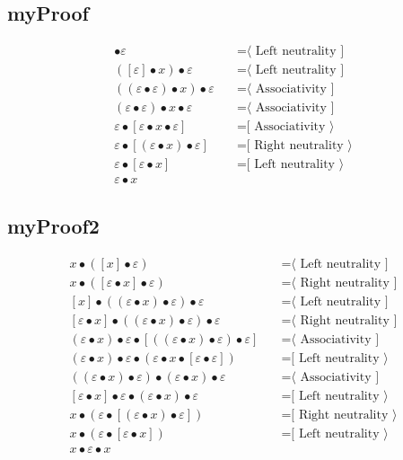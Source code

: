 \documentclass{article}
\begin{document}
\subsection{myProof}
\begin{align*}
[x] • ε
  & \quad \text{=⟨ Left neutrality ]}\\
([ε] • x) • ε
  & \quad \text{=⟨ Left neutrality ]}\\
((ε • ε) • x) • ε
  & \quad \text{=⟨ Associativity ]}\\
(ε • ε) • x • ε
  & \quad \text{=⟨ Associativity ]}\\
ε • [ε • x • ε]
  & \quad \text{=[ Associativity ⟩}\\
ε • [(ε • x) • ε]
  & \quad \text{=[ Right neutrality ⟩}\\
ε • [ε • x]
  & \quad \text{=[ Left neutrality ⟩}\\
ε • x
\end{align*}
\subsection{myProof2}
\begin{align*}
x • ([x] • ε)
  & \quad \text{=⟨ Left neutrality ]}\\
x • ([ε • x] • ε)
  & \quad \text{=⟨ Right neutrality ]}\\
[x] • ((ε • x) • ε) • ε
  & \quad \text{=⟨ Left neutrality ]}\\
[ε • x] • ((ε • x) • ε) • ε
  & \quad \text{=⟨ Right neutrality ]}\\
(ε • x) • ε • [((ε • x) • ε) • ε]
  & \quad \text{=⟨ Associativity ]}\\
(ε • x) • ε • (ε • x • [ε • ε])
  & \quad \text{=[ Left neutrality ⟩}\\
((ε • x) • ε) • (ε • x) • ε
  & \quad \text{=⟨ Associativity ]}\\
[ε • x] • ε • (ε • x) • ε
  & \quad \text{=[ Left neutrality ⟩}\\
x • (ε • [(ε • x) • ε])
  & \quad \text{=[ Right neutrality ⟩}\\
x • (ε • [ε • x])
  & \quad \text{=[ Left neutrality ⟩}\\
x • ε • x
\end{align*}
\end{document}
